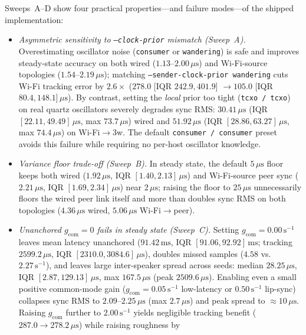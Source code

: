 \documentclass[11pt,a4paper]{article}
\theoremstyle{definition}
\begin{document}
Sweeps~A--D show four practical properties—and failure modes—of the shipped
implementation:
\begin{itemize}
\item \emph{Asymmetric sensitivity to \texttt{--clock-prior} mismatch (Sweep~A).}
  Overestimating oscillator noise (\texttt{consumer} or \texttt{wandering}) is
  safe and improves steady-state accuracy on both wired ($1.13$--$2.00\,\mu\text{s}$)
  and Wi-Fi-source topologies ($1.54$--$2.19\,\mu\text{s}$); matching
  \texttt{--sender-clock-prior wandering} cuts Wi-Fi tracking error by
  $2.6\times$ ($278.0$ [IQR $242.9, 401.9$] $\to 105.0$ [IQR
  $80.4, 148.1$]\,$\mu\text{s}$). By contrast, setting the \emph{local} prior
  too tight (\texttt{tcxo / tcxo}) on real quartz oscillators severely degrades
  sync RMS: $30.41\,\mu\text{s}$ (IQR $[22.11, 49.49]\,\mu\text{s}$, max
  $73.7\,\mu\text{s}$) wired and $51.92\,\mu\text{s}$ (IQR
  $[28.86, 63.27]\,\mu\text{s}$, max $74.4\,\mu\text{s}$) on Wi-Fi$\to$3w.
  The default \texttt{consumer / consumer} preset avoids this failure while
  requiring no per-host oscillator knowledge.
\item \emph{Variance floor trade-off (Sweep~B).} In steady state, the default
  $5\,\mu\text{s}$ floor keeps both wired ($1.92\,\mu\text{s}$, IQR
  $[1.40, 2.13]\,\mu\text{s}$) and Wi-Fi-source peer sync ($2.21\,\mu\text{s}$,
  IQR $[1.69, 2.34]\,\mu\text{s}$) near $2\,\mu\text{s}$; raising the floor to
  $25\,\mu\text{s}$ unnecessarily floors the wired peer link itself and more
  than doubles sync RMS on both topologies ($4.36\,\mu\text{s}$ wired,
  $5.06\,\mu\text{s}$ Wi-Fi$\to$peer).
\item \emph{Unanchored $g_{\mathrm{com}} = 0$ fails in steady state (Sweep~C).}
  Setting $g_{\mathrm{com}} = 0.00\,\text{s}^{-1}$ leaves mean latency
  unanchored ($91.42\,\text{ms}$, IQR $[91.06, 92.92]\,\text{ms}$; tracking
  $2599.2\,\mu\text{s}$, IQR $[2310.0, 3084.6]\,\mu\text{s}$), doubles missed
  samples ($4.58$ vs.\ $2.27\,\text{s}^{-1}$), and leaves large inter-speaker
  spread across seeds: median $28.25\,\mu\text{s}$, IQR
  $[2.87, 129.13]\,\mu\text{s}$, max $167.5\,\mu\text{s}$ (peak
  $2509.6\,\mu\text{s}$). Enabling even a small positive common-mode gain
  ($g_{\mathrm{com}} = 0.05\,\text{s}^{-1}$ low-latency or
  $0.50\,\text{s}^{-1}$ lip-sync) collapses sync RMS to $2.09$--$2.25\,\mu\text{s}$
  (max $2.7\,\mu\text{s}$) and peak spread to $\approx 10\,\mu\text{s}$.
  Raising $g_{\mathrm{com}}$ further to $2.00\,\text{s}^{-1}$ yields negligible
  tracking benefit ($287.0 \to 278.2\,\mu\text{s}$) while raising roughness by

\end{itemize}
\end{document}
